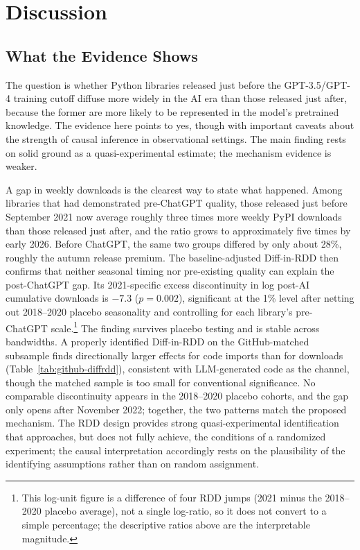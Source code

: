 \documentclass[12pt, a4paper]{report}
\begin{document}
\chapter{Discussion}\label{ch:discussion}

\section{What the Evidence Shows}\label{sec:disc-evidence}
The question is whether Python libraries released just before the GPT-3.5/GPT-4 training cutoff diffuse more widely in the AI era than those released just after, because the former are more likely to be represented in the model's pretrained knowledge. The evidence here points to yes, though with important caveats about the strength of causal inference in observational settings. The main finding rests on solid ground as a quasi-experimental estimate; the mechanism evidence is weaker.

A gap in weekly downloads is the clearest way to state what happened. Among libraries that had demonstrated pre-ChatGPT quality, those released just before September 2021 now average roughly three times more weekly PyPI downloads than those released just after, and the ratio grows to approximately five times by early 2026. Before ChatGPT, the same two groups differed by only about 28\%, roughly the autumn release premium. The baseline-adjusted Diff-in-RDD then confirms that neither seasonal timing nor pre-existing quality can explain the post-ChatGPT gap. Its 2021-specific excess discontinuity in log post-AI cumulative downloads is $-7.3$ ($p = 0.002$), significant at the 1\% level after netting out 2018--2020 placebo seasonality and controlling for each library's pre-ChatGPT scale.\footnote{This log-unit figure is a difference of four RDD jumps (2021 minus the 2018--2020 placebo average), not a single log-ratio, so it does not convert to a simple percentage; the descriptive ratios above are the interpretable magnitude.} The finding survives placebo testing and is stable across bandwidths. A properly identified Diff-in-RDD on the GitHub-matched subsample finds directionally larger effects for code imports than for downloads (Table~\ref{tab:github-diffrdd}), consistent with LLM-generated code as the channel, though the matched sample is too small for conventional significance. No comparable discontinuity appears in the 2018--2020 placebo cohorts, and the gap only opens after November 2022; together, the two patterns match the proposed mechanism. The RDD design provides strong quasi-experimental identification that approaches, but does not fully achieve, the conditions of a randomized experiment; the causal interpretation accordingly rests on the plausibility of the identifying assumptions rather than on random assignment.
\end{document}
